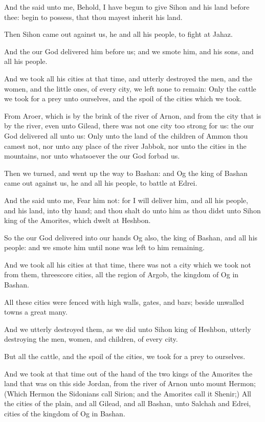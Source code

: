 \Verse And the \LORD said unto me, Behold, I have begun to give Sihon and his land before thee: begin to possess, that thou mayest inherit his land.

\Verse Then Sihon came out against us, he and all his people, to fight at Jahaz.

\Verse And the \LORD our God delivered him before us; and we smote him, and his sons, and all his people.

\Verse And we took all his cities at that time, and utterly destroyed the men, and the women, and the little ones, of every city, we left none to remain: \Verse Only the cattle we took for a prey unto ourselves, and the spoil of the cities which we took.

\Verse From Aroer, which is by the brink of the river of Arnon, and from the city that is by the river, even unto Gilead, there was not one city too strong for us: the \LORD our God delivered all unto us: \Verse Only unto the land of the children of Ammon thou camest not, nor unto any place of the river Jabbok, nor unto the cities in the mountains, nor unto whatsoever the \LORD our God forbad us.


\Chapter
\Verse Then we turned, and went up the way to Bashan: and Og the king of Bashan came out against us, he and all his people, to battle at Edrei.

\Verse And the \LORD said unto me, Fear him not: for I will deliver him, and all his people, and his land, into thy hand; and thou shalt do unto him as thou didst unto Sihon king of the Amorites, which dwelt at Heshbon.

\Verse So the \LORD our God delivered into our hands Og also, the king of Bashan, and all his people: and we smote him until none was left to him remaining.

\Verse And we took all his cities at that time, there was not a city which we took not from them, threescore cities, all the region of Argob, the kingdom of Og in Bashan.

\Verse All these cities were fenced with high walls, gates, and bars; beside unwalled towns a great many.

\Verse And we utterly destroyed them, as we did unto Sihon king of Heshbon, utterly destroying the men, women, and children, of every city.

\Verse But all the cattle, and the spoil of the cities, we took for a prey to ourselves.

\Verse And we took at that time out of the hand of the two kings of the Amorites the land that was on this side Jordan, from the river of Arnon unto mount Hermon; \Verse (Which Hermon the Sidonians call Sirion; and the Amorites call it Shenir;) \Verse All the cities of the plain, and all Gilead, and all Bashan, unto Salchah and Edrei, cities of the kingdom of Og in Bashan.

